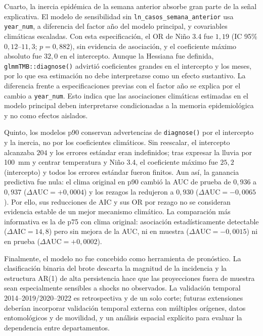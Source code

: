 \documentclass[11pt,a4paper]{article}
\begin{document}
Cuarto, la inercia epidémica de la semana anterior absorbe gran parte de la señal explicativa. El modelo de sensibilidad sin \texttt{ln\_casos\_semana\_anterior} usa \texttt{year\_num}, a diferencia del factor año del modelo principal, y covariables climáticas escaladas. Con esta especificación, el OR de Niño 3.4 fue $1{,}19$ (IC 95\% $0{,}12$--$11{,}3$; $p = 0{,}882$), sin evidencia de asociación, y el coeficiente máximo absoluto fue $32{,}0$ en el intercepto. Aunque la Hessiana fue definida, \texttt{glmmTMB::diagnose()} advirtió coeficientes grandes en el intercepto y los meses, por lo que esa estimación no debe interpretarse como un efecto sustantivo. La diferencia frente a especificaciones previas con el factor año se explica por el cambio a \texttt{year\_num}. Esto indica que las asociaciones climáticas estimadas en el modelo principal deben interpretarse condicionadas a la memoria epidemiológica y no como efectos aislados.

\medskip

Quinto, los modelos p90 conservan advertencias de \texttt{diagnose()} por el intercepto y la inercia, no por los coeficientes climáticos. Sin reescalar, el intercepto alcanzaba $204$ y los errores estándar eran indefinidos; tras expresar la lluvia por 100~mm y centrar temperatura y Niño 3.4, el coeficiente máximo fue $25{,}2$ (intercepto) y todos los errores estándar fueron finitos. Aun así, la ganancia predictiva fue nula: el clima original en p90 cambió la AUC de prueba de $0{,}936$ a $0{,}937$ ($\Delta\text{AUC} = +0{,}0004$) y los rezagos la redujeron a $0{,}930$ ($\Delta\text{AUC} = -0{,}0065$). Por ello, sus reducciones de AIC y sus OR por rezago no se consideran evidencia estable de un mejor mecanismo climático. La comparación más informativa es la de p75 con clima original: asociación estadísticamente detectable ($\Delta\text{AIC} = 14{,}8$) pero sin mejora de la AUC, ni en muestra ($\Delta\text{AUC} = -0{,}0015$) ni en prueba ($\Delta\text{AUC} = +0{,}0002$).

\medskip

Finalmente, el modelo no fue concebido como herramienta de pronóstico. La clasificación binaria del brote descarta la magnitud de la incidencia y la estructura AR(1) de alta persistencia hace que las proyecciones fuera de muestra sean especialmente sensibles a shocks no observados. La validación temporal 2014--2019/2020--2022 es retrospectiva y de un solo corte; futuras extensiones deberían incorporar validación temporal externa con múltiples orígenes, datos entomológicos y de movilidad, y un análisis espacial explícito para evaluar la dependencia entre departamentos.
\end{document}
